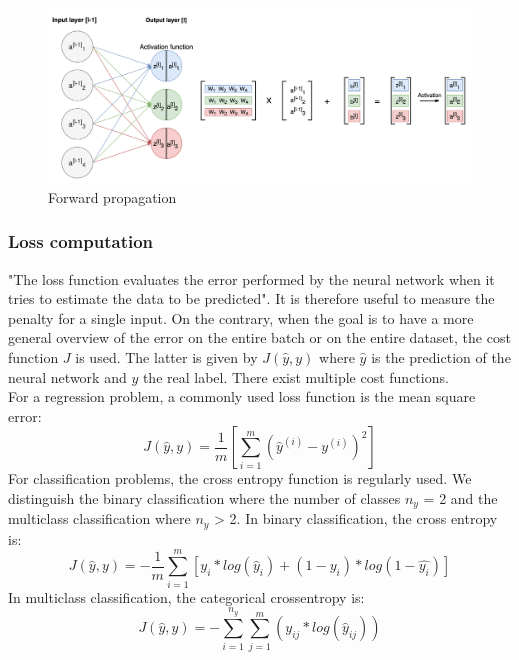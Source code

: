 \begin{figure}[!h]
\centering
\includegraphics[width=1\textwidth, keepaspectratio=true]{./figures/forward_propagation.png}
\caption{Forward propagation }
\label{forward_propagation}
\end{figure}

\subsubsection{Loss computation}
"The loss function evaluates the error performed by the neural network when it tries
to estimate the data to be predicted"\cite{18}. It is therefore useful to measure the penalty for a single input. On the contrary, when the goal is to have a more general overview of the error on the entire batch or on the entire dataset, the cost function $J$ is used. The latter is given by $J(\hat{y}, y)$ where $\hat{y}$ is the prediction of the neural network and $y$ the real label. There exist multiple cost functions.\\
For a regression problem, a commonly used loss function is the mean square error:
\begin{equation}
J(\hat{y}, y) = \frac{1}{m}[\sum_{i=1}^{m} (\hat{y}^{(i)} - y^{(i)})^{2}]
\end{equation}
For classification problems, the cross entropy function is regularly used. We distinguish the binary classification where the number of classes $n_{y}$ = 2 and the multiclass classification where $n_{y}$ > 2. In binary classification, the cross entropy is:
\begin{equation}
J(\hat{y}, y) = -\frac{1}{m}\sum_{i=1}^{m} [y_{i}*log(\hat{y}_{i}) + (1-y_{i})*log(1-\hat{y_i})]
\end{equation}
In multiclass classification, the categorical crossentropy is:
\begin{equation}
J(\hat{y}, y) = - \sum_{i=1}^{n_{y}} \sum_{j=1}^{m} (y_{ij}*log(\hat{y}_{ij}))
\end{equation}


